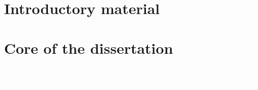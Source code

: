 \documentclass[
  oneside,
  11pt, a4paper,
  footinclude=true,
  headinclude=true,
  cleardoublepage=empty
]{scrbook}
\begin{document}
	\cleardoublepage
	\tableofcontents
	
	\cleardoublepage
	\listoffigures
	
	\cleardoublepage
	\listoftables
	
	
	\printglossary[type=\acronymtype, title=List of Acronyms, nonumberlist=true, toctitle=List of Acronyms, style=altlong4colwithindent]
	\cleardoublepage
	\setcounter{page}{3}

\part{Introductory material}






\part{Core of the dissertation}



		
\cleardoublepage


\printindex
	
	\appendix
	\renewcommand\chaptername{Appendix}




	
\begin{backcover}
\thispagestyle{empty} \pagecolor{grey} \textcolor{white} {\selectfont ~\vfill
\noindent
NB: place here information about funding, FCT project, etc in which the work is framed. Leave empty otherwise.
%
\vfill ~}
\end{backcover}
\end{document}
